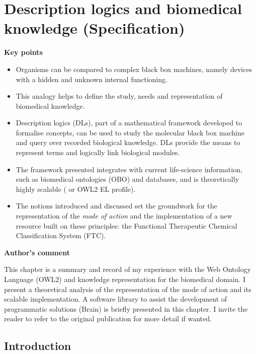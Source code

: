 \chapter{Description logics and biomedical knowledge (Specification)}

\textbf{Key points}
\begin{itemize}
  \item Organisms can be compared to complex black box machines, namely devices with a hidden and unknown internal functioning.
  \item This analogy helps to define the study, needs and representation of biomedical knowledge.
  \item Description logics (DLs), part of a mathematical framework developed to formalise concepts, can be used to study the molecular black box machine and query over recorded biological knowledge. DLs provide the means to represent terms and logically link biological modules.
  \item The framework presented integrates with current life-science information, such as biomedical ontologies (OBO) and databases, and is theoretically highly scalable ( or OWL2 EL profile).
  \item The notions introduced and discussed set the groundwork for the representation of the \emph{mode of action} and the implementation of a new resource built on these principles: the Functional Therapeutic Chemical Classification System (FTC).
\end{itemize}

\textbf{Author's comment}

This chapter is a summary and record of my experience with the Web Ontology Language (OWL2) and knowledge representation for the biomedical domain. I present a theoretical analysis of the representation of the mode of action and its scalable implementation. A software library to assist the development of programmatic solutions (Brain) is briefly presented in this chapter. I invite the reader to refer to the original publication \citep{croset2013brain} for more detail if wanted.

\hrulefill

\section{Introduction}

